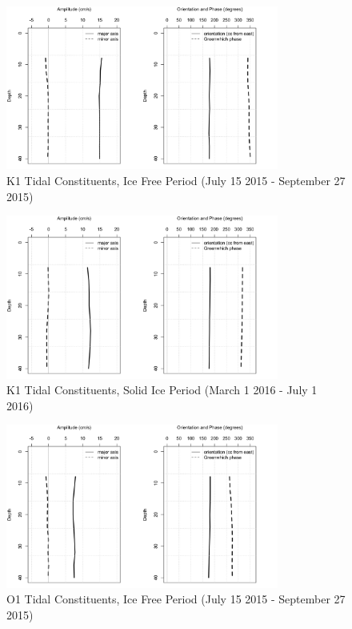 \documentclass[12pt]{dforeport}
\begin{document}
\begin{figure}  
\centering
\includegraphics[width = 0.8\textwidth]{./figures/57_K1TC_if_2015.png}
\caption[K1 Tidal Constituents, Ice free, 2015]{K1 Tidal Constituents, Ice Free Period (July 15 2015 - September 27 2015)}
\label{f:k1_if_2015}
\end{figure}

\begin{figure}  
\centering
\includegraphics[width = 0.8\textwidth]{./figures/58_K1TC_si_2015.png}
\caption[K1 Tidal Constituents, Solid Ice, 2015]{K1 Tidal Constituents, Solid Ice Period (March 1 2016 - July 1 2016)}
\label{f:k1_si_2015}
\end{figure}


\begin{figure}  
\centering
\includegraphics[width = 0.8\textwidth]{./figures/59_O1TC_if_2015.png}
\caption[O1 Tidal Constituents, Ice free, 2015]{O1 Tidal Constituents, Ice Free Period (July 15 2015 - September 27 2015)}
\label{f:o1_if_2015}
\end{figure}
\end{document}
